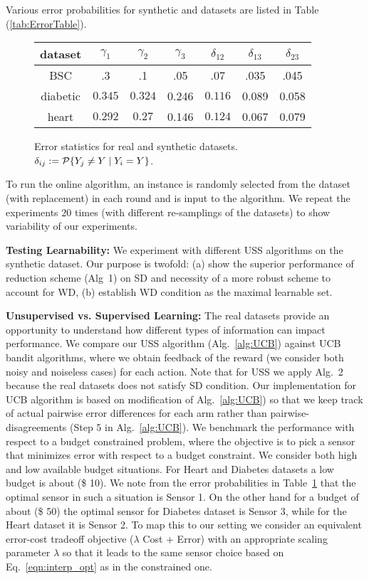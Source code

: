 %
Various error probabilities for synthetic and datasets are listed in Table (\ref{tab:ErrorTable}).  
	\begin{figure}[!h]
		\small
		\begin{tabular}[c]{c|c|c|c|c|c|c } 
			\label{tab:ErrorTable}
			dataset & $\gamma_1$ & $\gamma_2$ & $\gamma_3$ &$\delta_{12}$ & $\delta_{13}$ & $\delta_{23}$ \\ \hline 
			BSC & .3 & .1 & .05 & .07 & .035 & .045\\  \hline
			diabetic & $0.345 $ & $ 0.324$ & 0.246 & $ 0.116 $ & 0.089 &0.058\\  \hline
			heart & $0.292$ & $0.27$ & 0.146 & $0.124$ & 0.067 & 0.079\\  \hline
		\end{tabular}
		\caption{Error statistics for real and synthetic datasets. $\delta_{ij}:=\P\{Y_j\neq Y \mid Y_i = Y\}$.}
\label{tab:error_stats}
	\end{figure}
To run the online algorithm, an instance is randomly selected from the dataset (with replacement) in each round and is input to the  algorithm. We repeat the experiments $20$ times (with different re-samplings of the datasets) to show variability of our experiments.

\noindent
{\bf Testing Learnability:}
We experiment with different USS algorithms on the synthetic dataset. Our purpose is twofold: (a) show the superior performance of reduction scheme (Alg~1) on SD and necessity of a more robust scheme to account for WD, (b) establish WD condition as the maximal learnable set.

\noindent
{\bf Unsupervised vs. Supervised Learning:}
The real datasets provide an opportunity to understand how different types of information can impact performance. We compare our USS algorithm (Alg.~\ref{alg:UCB}) against UCB bandit algorithms, where we obtain feedback of the reward (we consider both noisy and noiseless cases) for each action. Note that for USS we apply Alg.~2 because the real datasets does not satisfy SD condition. Our implementation for UCB algorithm is based on modification of Alg.~\ref{alg:UCB}) so that we keep track of actual pairwise error differences for each arm rather than pairwise-disagreements (Step 5 in Alg.~\ref{alg:UCB}). We benchmark the performance with respect to a budget constrained problem, where the objective is to pick a sensor that minimizes error with respect to a budget constraint. We consider both high and low available budget situations. For Heart and Diabetes datasets a low budget is about (\$ 10). We note from the error probabilities in Table~\ref{tab:error_stats} that the optimal sensor in such a situation is Sensor 1. On the other hand for a budget of about (\$ 50) the optimal sensor for Diabetes dataset is Sensor 3, while for the Heart dataset it is Sensor 2. To map this to our setting we consider an equivalent error-cost tradeoff objective ($\lambda$ Cost + Error) with an appropriate scaling parameter $\lambda$ so that it leads to the same sensor choice based on Eq.~\ref{eqn:interp_opt} as in the constrained one.


